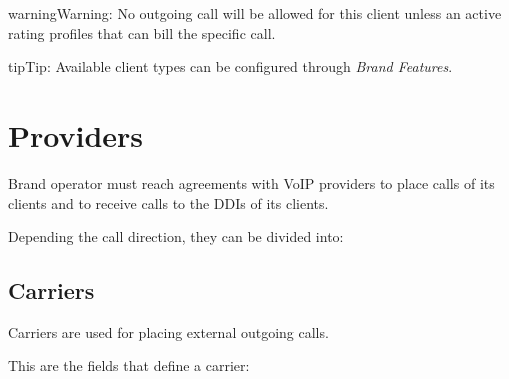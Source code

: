 \documentclass[letterpaper,10pt,english]{sphinxmanual}
\begin{document}
\begin{notice}{warning}{Warning:}
No outgoing call will be allowed for this client unless an active rating profiles that can
bill the specific call.
\end{notice}

\begin{notice}{tip}{Tip:}
Available client types can be configured through \emph{Brand Features}.
\end{notice}


\section{Providers}
\label{administration_portal/brand/providers/index::doc}\label{administration_portal/brand/providers/index:providers}
Brand operator must reach agreements with VoIP providers to place calls of its clients and to receive calls to the
DDIs of its clients.

Depending the call direction, they can be divided into:


\subsection{Carriers}
\label{administration_portal/brand/providers/carriers:id1}\label{administration_portal/brand/providers/carriers::doc}\label{administration_portal/brand/providers/carriers:carriers}
Carriers are used for placing external outgoing calls.

This are the fields that define a carrier:
\end{document}
